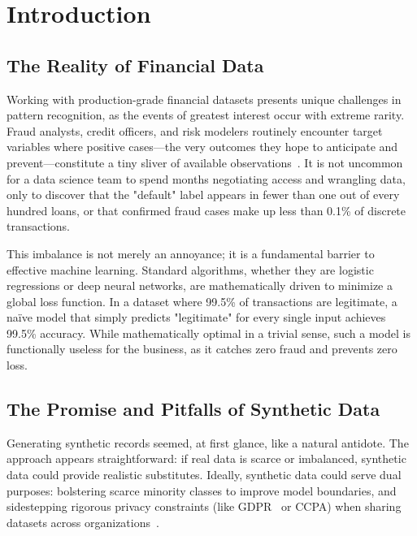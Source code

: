 \documentclass[conference]{IEEEtran}
\begin{document}
\section{Introduction}

\subsection{The Reality of Financial Data}
Working with production-grade financial datasets presents unique challenges in pattern recognition, as the events of greatest interest occur with extreme rarity. Fraud analysts, credit officers, and risk modelers routinely encounter target variables where positive cases—the very outcomes they hope to anticipate and prevent—constitute a tiny sliver of available observations~\cite{he2009imbalanced}. It is not uncommon for a data science team to spend months negotiating access and wrangling data, only to discover that the "default" label appears in fewer than one out of every hundred loans, or that confirmed fraud cases make up less than 0.1\% of discrete transactions.

This imbalance is not merely an annoyance; it is a fundamental barrier to effective machine learning. Standard algorithms, whether they are logistic regressions or deep neural networks, are mathematically driven to minimize a global loss function. In a dataset where 99.5\% of transactions are legitimate, a naïve model that simply predicts "legitimate" for every single input achieves 99.5\% accuracy. While mathematically optimal in a trivial sense, such a model is functionally useless for the business, as it catches zero fraud and prevents zero loss.

\subsection{The Promise and Pitfalls of Synthetic Data}
Generating synthetic records seemed, at first glance, like a natural antidote. The approach appears straightforward: if real data is scarce or imbalanced, synthetic data could provide realistic substitutes. Ideally, synthetic data could serve dual purposes: bolstering scarce minority classes to improve model boundaries, and sidestepping rigorous privacy constraints (like GDPR~\cite{gdpr2016regulation} or CCPA) when sharing datasets across organizations~\cite{figueira2022survey}.
\end{document}
